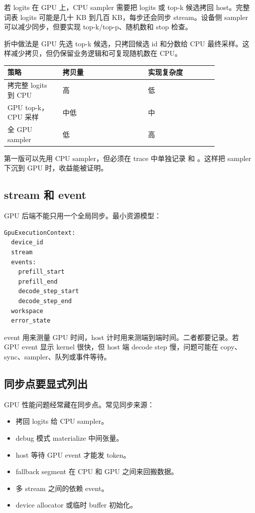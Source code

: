 若 logits 在 GPU 上，CPU sampler 需要把 logits 或 top-k 候选拷回 host。完整词表 logits 可能是几十 KB 到几百 KB，每步还会同步 stream。设备侧 sampler 可以减少同步，但要实现 top-k/top-p、随机数和 stop 检查。

折中做法是 GPU 先选 top-k 候选，只拷回候选 id 和分数给 CPU 最终采样。这样减少拷贝，但仍保留业务逻辑和可复现随机数在 CPU。

\begin{center}
\begin{tabular}{p{0.22\linewidth}p{0.34\linewidth}p{0.28\linewidth}}
\toprule
策略 & 拷贝量 & 实现复杂度 \\
\midrule
拷完整 logits 到 CPU & 高 & 低 \\
GPU top-k，CPU 采样 & 中低 & 中 \\
全 GPU sampler & 低 & 高 \\
\bottomrule
\end{tabular}
\end{center}

第一版可以先用 CPU sampler，但必须在 trace 中单独记录  和 。这样把 sampler 下沉到 GPU 时，收益能被证明。

\subsection{stream 和 event}

GPU 后端不能只用一个全局同步。最小资源模型：

\begin{lstlisting}[numbers=none,caption={GPU 执行资源}]
GpuExecutionContext:
  device_id
  stream
  events:
    prefill_start
    prefill_end
    decode_step_start
    decode_step_end
  workspace
  error_state
\end{lstlisting}

event 用来测量 GPU 时间，host 计时用来测端到端时间。二者都要记录。若 GPU event 显示 kernel 很快，但 host 端 decode step 慢，问题可能在 copy、sync、sampler、队列或事件等待。

\subsection{同步点要显式列出}

GPU 性能问题经常藏在同步点。常见同步来源：

\begin{itemize}
  \item 拷回 logits 给 CPU sampler。
  \item debug 模式 materialize 中间张量。
  \item host 等待 GPU event 才能发 token。
  \item fallback segment 在 CPU 和 GPU 之间来回搬数据。
  \item 多 stream 之间的依赖 event。
  \item device allocator 或临时 buffer 初始化。
\end{itemize}

